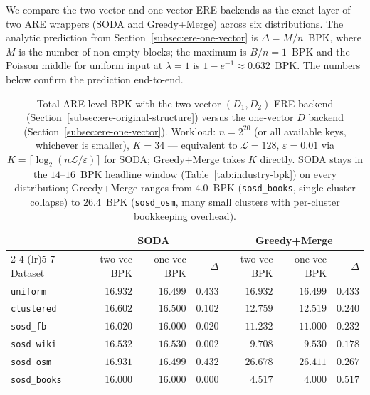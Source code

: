 We compare the two-vector and one-vector ERE backends as the exact layer
of two ARE wrappers (SODA and Greedy+Merge) across six distributions.
The analytic prediction from
Section~\ref{subsec:ere-one-vector} is $\Delta = M/n$~BPK, where $M$ is
the number of non-empty blocks; the maximum is $B/n = 1$~BPK and the
Poisson middle for uniform input at $\lambda = 1$ is
$1 - e^{-1} \approx 0.632$~BPK. The numbers below confirm the prediction
end-to-end.

\begin{table}[H]
    \centering
    \setlength{\tabcolsep}{5pt}
    \small
    \begin{tabular}{@{}lrrrrrr@{}}
        \toprule
        & \multicolumn{3}{c}{SODA} & \multicolumn{3}{c}{Greedy+Merge} \\
        \cmidrule(lr){2-4} \cmidrule(lr){5-7}
        Dataset
        & two-vec BPK & one-vec BPK & $\Delta$
        & two-vec BPK & one-vec BPK & $\Delta$ \\
        \midrule
        \texttt{uniform}     & $16.932$ & $16.499$ & $0.433$ & $16.932$ & $16.499$ & $0.433$ \\
        \texttt{clustered}   & $16.602$ & $16.500$ & $0.102$ & $12.759$ & $12.519$ & $0.240$ \\
        \texttt{sosd\_fb}    & $16.020$ & $16.000$ & $0.020$ & $11.232$ & $11.000$ & $0.232$ \\
        \texttt{sosd\_wiki}  & $16.532$ & $16.530$ & $0.002$ & $9.708$  & $9.530$  & $0.178$ \\
        \texttt{sosd\_osm}   & $16.931$ & $16.499$ & $0.432$ & $26.678$ & $26.411$ & $0.267$ \\
        \texttt{sosd\_books} & $16.000$ & $16.000$ & $0.000$ & $4.517$  & $4.000$  & $0.517$ \\
        \bottomrule
    \end{tabular}
    \caption{Total ARE-level BPK with the two-vector $(D_1, D_2)$ ERE backend
        (Section~\ref{subsec:ere-original-structure}) versus the one-vector $D$
        backend (Section~\ref{subsec:ere-one-vector}). Workload: $n = 2^{20}$
        (or all available keys, whichever is smaller), $K = 34$ — equivalent to
        $\mathcal{L} = 128$, $\varepsilon = 0.01$ via $K = \lceil \log_2(n\mathcal{L}/\varepsilon) \rceil$
        for SODA; Greedy+Merge takes $K$ directly. SODA stays in the
        $14$--$16$~BPK headline window (Table~\ref{tab:industry-bpk}) on every
        distribution; Greedy+Merge ranges from $4.0$~BPK (\texttt{sosd\_books},
        single-cluster collapse) to $26.4$~BPK (\texttt{sosd\_osm}, many small
        clusters with per-cluster bookkeeping overhead).}
    \label{tab:ere-backend-cross-distribution}
\end{table}

